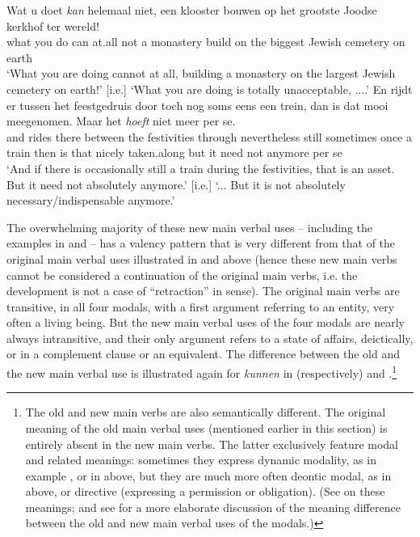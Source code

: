\documentclass[output=paper]{langsci/langscibook}
\begin{document}
\ea%
    \label{ex:nuyts:7}
   \gll Wat u doet \textit{kan} helemaal niet, een klooster bouwen op het grootste Joodse kerkhof ter wereld!\\
  what you do can at.all not a monastery build on the biggest Jewish cemetery on earth\\
\glt   [lit.] `What you are doing cannot at all, building a monastery on the largest Jewish cemetery on earth!' [i.e.] `What you are doing is totally unacceptable, ....'
\ex%
    \label{ex:nuyts:8}
    \gll          En rijdt er tussen het feestgedruis door toch nog soms eens een trein, dan is dat mooi meegenomen. Maar het \textit{hoeft} niet meer per se.\\
  and rides there between the festivities through nevertheless still sometimes once a train then is that nicely taken.along but it need not anymore per se\\
\glt   [lit.] `And if there is occasionally still a train during the festivities, that is an asset. But it need not absolutely anymore.' [i.e.] `... But it is not absolutely necessary/indispensable anymore.'
\z

The overwhelming majority of these new main verbal uses – including the examples in  and  – has a valency pattern that is very different from that of the original main verbal uses illustrated in  and  above (hence these new main verbs cannot be considered a continuation of the original main verbs, i.e. the development is not a case of “retraction” in  sense). The original main verbs are transitive, in all four modals, with a first argument referring to an entity, very often a living being. But the new main verbal uses of the four modals are nearly always intransitive, and their only argument refers to a state of affairs, deictically, or in a complement clause or an equivalent. The difference between the old and the new main verbal use is illustrated again for \textit{kunnen} in (respectively)  and .\footnote{The old and new main verbs are also semantically different. The original meaning of the old main verbal uses (mentioned earlier in this section) is entirely absent in the new main verbs. The latter exclusively feature modal and related meanings: sometimes they express dynamic modality, as in example , or in  above, but they are much more often deontic modal, as in  above, or directive (expressing a permission or obligation). (See  on these meanings; and see \citet{Nuyts2013} for a more elaborate discussion of the meaning difference between the old and new main verbal uses of the modals.)}
\end{document}
